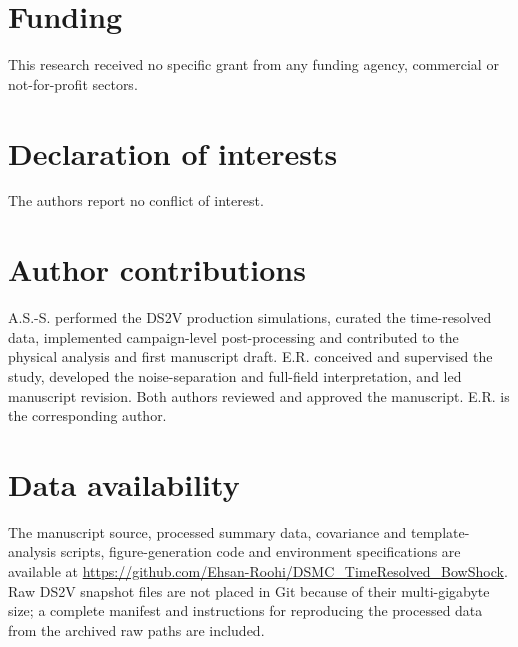 \section*{Funding}
This research received no specific grant from any funding agency, commercial or not-for-profit sectors.

\section*{Declaration of interests}
The authors report no conflict of interest.

\section*{Author contributions}
A.S.-S. performed the DS2V production simulations, curated the time-resolved data, implemented campaign-level post-processing and contributed to the physical analysis and first manuscript draft. E.R. conceived and supervised the study, developed the noise-separation and full-field interpretation, and led manuscript revision. Both authors reviewed and approved the manuscript. E.R. is the corresponding author.

\section*{Data availability}
The manuscript source, processed summary data, covariance and template-analysis scripts, figure-generation code and environment specifications are available at \url{https://github.com/Ehsan-Roohi/DSMC_TimeResolved_BowShock}. Raw DS2V snapshot files are not placed in Git because of their multi-gigabyte size; a complete manifest and instructions for reproducing the processed data from the archived raw paths are included.
